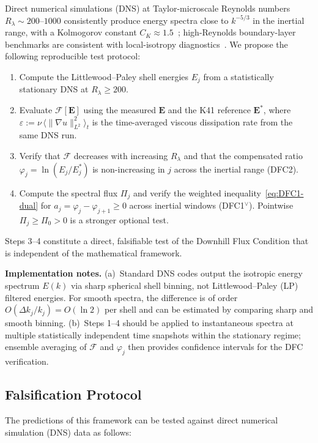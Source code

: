 \documentclass[12pt,a4paper]{article}
\theoremstyle{breakdef}
\theoremstyle{breakplain}
\theoremstyle{breakdef}
\begin{document}
Direct numerical simulations (DNS) at Taylor-microscale Reynolds numbers
$R_\lambda \sim 200$--$1000$ consistently produce energy spectra close to
$k^{-5/3}$ in the inertial range, with a Kolmogorov constant
$C_K \approx 1.5$~\cite{ES06,Frisch95,MY75}; high-Reynolds
boundary-layer benchmarks are consistent with local-isotropy
diagnostics~\cite{SaddoughiVeeravalli94}.  We propose the following
reproducible test protocol:
\begin{enumerate}
\item Compute the Littlewood--Paley shell energies $E_j$ from
  a statistically stationary DNS at $R_\lambda \ge 200$.
\item Evaluate $\mathcal{F}[\mathbf{E}]$ using the measured
  $\mathbf{E}$ and the K41 reference $\mathbf{E}^*$, where
  $\varepsilon := \nu\,\langle\|\nabla u\|_{L^2}^2\rangle_t$
  is the time-averaged viscous dissipation rate from the same DNS run.
\item Verify that $\mathcal{F}$ decreases with increasing $R_\lambda$
  and that the compensated ratio $\varphi_j = \ln(E_j/E_j^*)$ is
  non-increasing in $j$ across the inertial range (DFC2).
\item Compute the spectral flux $\Pi_j$ and verify the weighted
  inequality~\eqref{eq:DFC1-dual} for
  $a_j=\varphi_j-\varphi_{j+1}\ge0$ across inertial windows
  (DFC1$^\vee$). Pointwise $\Pi_j\ge\Pi_0>0$ is a stronger optional test.
\end{enumerate}
Steps 3--4 constitute a direct, falsifiable test of the Downhill Flux
Condition that is independent of the mathematical framework.

\smallskip\noindent
\textbf{Implementation notes.}\quad
(a)~Standard DNS codes output the isotropic energy spectrum $E(k)$
via sharp spherical shell binning, not Littlewood--Paley (LP) filtered
energies.  For smooth spectra, the difference is of order
$O(\Delta k_j / k_j) = O(\ln 2)$ per shell and can be estimated by
comparing sharp and smooth binning.
(b)~Steps 1--4 should be applied to instantaneous spectra at multiple
statistically independent time snapshots within the stationary regime;
ensemble averaging of $\mathcal{F}$ and $\varphi_j$ then provides
confidence intervals for the DFC verification.

\subsection{Falsification Protocol}
\label{sec:falsification}

The predictions of this framework can be tested against direct numerical simulation (DNS) data as follows:
\end{document}
